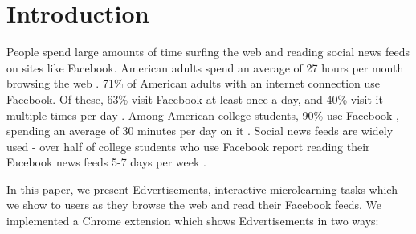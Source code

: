 \documentclass{sigchi}
\begin{document}
\begin{abstract}
\end{abstract}




\section{Introduction}

People spend large amounts of time surfing the web and reading social news feeds on sites like Facebook.
American adults spend an average of 27 hours per month browsing the web \cite{nielsen2014}.
71\% of American adults with an internet connection use Facebook. Of these, 63\% visit Facebook at least once a day, and 40\% visit it multiple times per day \cite{socialmediaupdate}. Among American college students, 90\% use Facebook \cite{collegefacebook2}, spending an average of 30 minutes per day on it \cite{collegefacebook}. Social news feeds are widely used - over half of college students who use Facebook report reading their Facebook news feeds 5-7 days per week \cite{collegefacebook}. %

In this paper, we present Edvertisements, interactive microlearning tasks which we show to users as they browse the web and read their Facebook feeds. We implemented a Chrome extension which shows Edvertisements in two ways:
\end{document}
